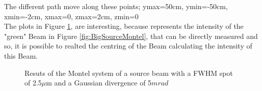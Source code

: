 The different path move along these points; ymax=50cm, ymin=-50cm, xmin=-2cm, xmax=0, zmax=2cm, zmin=0
\\
The plots in Figure \ref{fig: 2nd reuslt diff. path}, are interesting, because represents the intensity of the "green" Beam in Figure \ref{fig:BigSourceMontel}, that can be directly measured and so, it is possible to realted the centring of the Beam calculating the intensity of this Beam.
%
\begin{figure}[]
%
\centering
%
%
\quad
%
%
\caption{Resuts of the Montel system of a source beam with a FWHM spot of 2.5$\mu $m and a Gaussian divergence of 5$mrad $}
%
\label{fig: 2nd reuslt diff. path}
%
\end{figure}